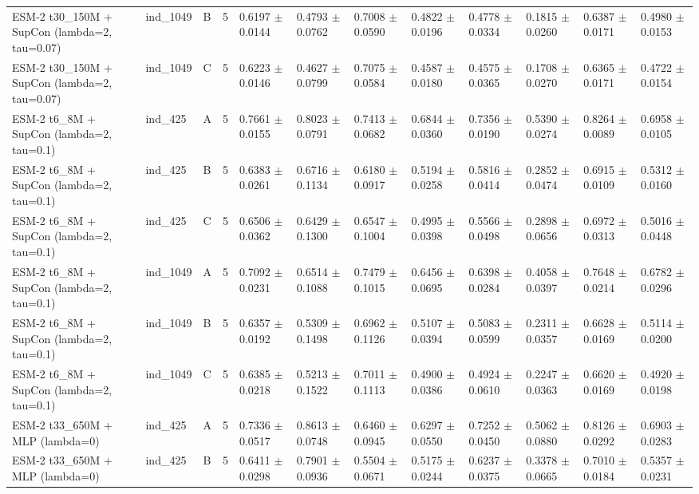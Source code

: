 \begin{table}[ht]
\begin{tabular}{llllllllllll}
ESM-2 t30\_150M + SupCon (lambda=2, tau=0.07) & ind\_1049 & B & 5 & 0.6197 $\pm$ 0.0144 & 0.4793 $\pm$ 0.0762 & 0.7008 $\pm$ 0.0590 & 0.4822 $\pm$ 0.0196 & 0.4778 $\pm$ 0.0334 & 0.1815 $\pm$ 0.0260 & 0.6387 $\pm$ 0.0171 & 0.4980 $\pm$ 0.0153 \\
ESM-2 t30\_150M + SupCon (lambda=2, tau=0.07) & ind\_1049 & C & 5 & 0.6223 $\pm$ 0.0146 & 0.4627 $\pm$ 0.0799 & 0.7075 $\pm$ 0.0584 & 0.4587 $\pm$ 0.0180 & 0.4575 $\pm$ 0.0365 & 0.1708 $\pm$ 0.0270 & 0.6365 $\pm$ 0.0171 & 0.4722 $\pm$ 0.0154 \\
ESM-2 t6\_8M + SupCon (lambda=2, tau=0.1) & ind\_425 & A & 5 & 0.7661 $\pm$ 0.0155 & 0.8023 $\pm$ 0.0791 & 0.7413 $\pm$ 0.0682 & 0.6844 $\pm$ 0.0360 & 0.7356 $\pm$ 0.0190 & 0.5390 $\pm$ 0.0274 & 0.8264 $\pm$ 0.0089 & 0.6958 $\pm$ 0.0105 \\
ESM-2 t6\_8M + SupCon (lambda=2, tau=0.1) & ind\_425 & B & 5 & 0.6383 $\pm$ 0.0261 & 0.6716 $\pm$ 0.1134 & 0.6180 $\pm$ 0.0917 & 0.5194 $\pm$ 0.0258 & 0.5816 $\pm$ 0.0414 & 0.2852 $\pm$ 0.0474 & 0.6915 $\pm$ 0.0109 & 0.5312 $\pm$ 0.0160 \\
ESM-2 t6\_8M + SupCon (lambda=2, tau=0.1) & ind\_425 & C & 5 & 0.6506 $\pm$ 0.0362 & 0.6429 $\pm$ 0.1300 & 0.6547 $\pm$ 0.1004 & 0.4995 $\pm$ 0.0398 & 0.5566 $\pm$ 0.0498 & 0.2898 $\pm$ 0.0656 & 0.6972 $\pm$ 0.0313 & 0.5016 $\pm$ 0.0448 \\
ESM-2 t6\_8M + SupCon (lambda=2, tau=0.1) & ind\_1049 & A & 5 & 0.7092 $\pm$ 0.0231 & 0.6514 $\pm$ 0.1088 & 0.7479 $\pm$ 0.1015 & 0.6456 $\pm$ 0.0695 & 0.6398 $\pm$ 0.0284 & 0.4058 $\pm$ 0.0397 & 0.7648 $\pm$ 0.0214 & 0.6782 $\pm$ 0.0296 \\
ESM-2 t6\_8M + SupCon (lambda=2, tau=0.1) & ind\_1049 & B & 5 & 0.6357 $\pm$ 0.0192 & 0.5309 $\pm$ 0.1498 & 0.6962 $\pm$ 0.1126 & 0.5107 $\pm$ 0.0394 & 0.5083 $\pm$ 0.0599 & 0.2311 $\pm$ 0.0357 & 0.6628 $\pm$ 0.0169 & 0.5114 $\pm$ 0.0200 \\
ESM-2 t6\_8M + SupCon (lambda=2, tau=0.1) & ind\_1049 & C & 5 & 0.6385 $\pm$ 0.0218 & 0.5213 $\pm$ 0.1522 & 0.7011 $\pm$ 0.1113 & 0.4900 $\pm$ 0.0386 & 0.4924 $\pm$ 0.0610 & 0.2247 $\pm$ 0.0363 & 0.6620 $\pm$ 0.0169 & 0.4920 $\pm$ 0.0198 \\
ESM-2 t33\_650M + MLP (lambda=0) & ind\_425 & A & 5 & 0.7336 $\pm$ 0.0517 & 0.8613 $\pm$ 0.0748 & 0.6460 $\pm$ 0.0945 & 0.6297 $\pm$ 0.0550 & 0.7252 $\pm$ 0.0450 & 0.5062 $\pm$ 0.0880 & 0.8126 $\pm$ 0.0292 & 0.6903 $\pm$ 0.0283 \\
ESM-2 t33\_650M + MLP (lambda=0) & ind\_425 & B & 5 & 0.6411 $\pm$ 0.0298 & 0.7901 $\pm$ 0.0936 & 0.5504 $\pm$ 0.0671 & 0.5175 $\pm$ 0.0244 & 0.6237 $\pm$ 0.0375 & 0.3378 $\pm$ 0.0665 & 0.7010 $\pm$ 0.0184 & 0.5357 $\pm$ 0.0231 \\

\end{tabular}
\end{table}
